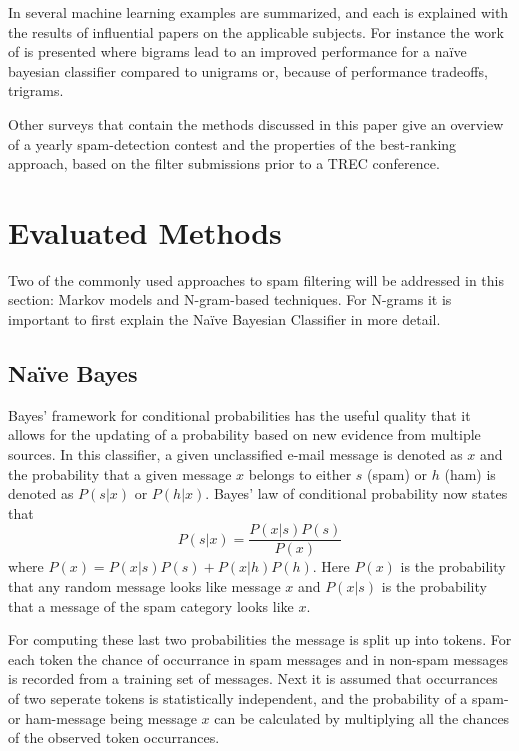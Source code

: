 \documentclass[runningheads,a4paper]{llncs}
\begin{document}
In \cite{2009elsevier} several machine learning examples are summarized, 
and each is explained with the results of influential papers on 
the applicable subjects. For instance the work of \cite{medlock2006} 
is presented where bigrams lead to an improved performance for a na\"ive 
bayesian classifier compared to unigrams or, because of performance 
tradeoffs, trigrams.

Other surveys that contain the methods discussed in this paper give an overview 
of a yearly spam-detection contest and the properties of the best-ranking 
approach, based on the filter submissions prior to a TREC conference\cite{2005overview,2006overview,2007overview}. 

\section{Evaluated Methods}
Two of the commonly used approaches to spam filtering will be addressed in this section: Markov models and N-gram-based techniques. For N-grams it is important to first explain the Na\"ive Bayesian Classifier in more detail.

\subsection{Na\"ive Bayes}
Bayes' framework for conditional probabilities has the useful quality that it allows 
for the updating of a probability based on new evidence from multiple sources. In 
this classifier, a given unclassified e-mail message is denoted as $x$ and the 
probability that a given message $x$ belongs to either $s$ (spam) or $h$ (ham) is 
denoted as $P(s|x)$ or $P(h|x)$. Bayes' law of conditional probability now states that 
\begin{equation}
\label{eq:bayes}
P(s|x)=\frac{P(x|s)P(s)}{P(x)}
\end{equation}
where $P(x) = P(x|s)P(s)+P(x|h)P(h)$. Here $P(x)$ is the 
probability that any random message looks like message $x$ and $P(x|s)$ is the 
probability that a message of the spam category looks like $x$.

For computing these last two probabilities the message is split up into tokens. For each
token the chance of occurrance in spam messages and in non-spam messages is recorded 
from a training set of messages. Next it is assumed that occurrances of two seperate 
tokens is statistically independent, and the probability of a spam- or ham-message being
message $x$ can be calculated by multiplying all the chances of the observed token occurrances.
\end{document}
